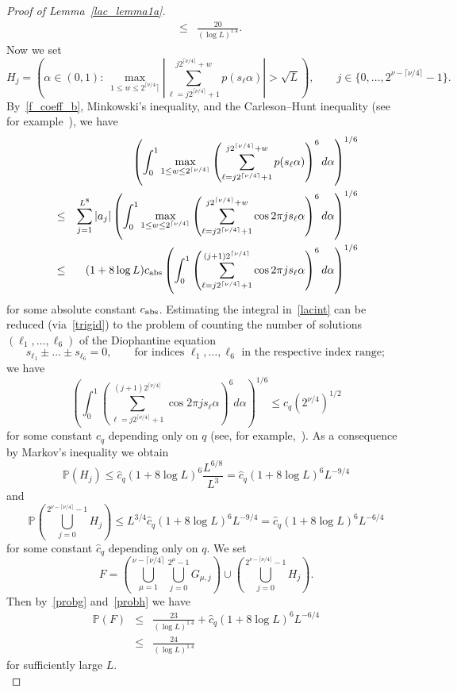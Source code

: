 \documentclass[12pt]{amsart}
\newcommand {\p} {\mathbb{P}}
\begin{document}
\begin{proof}[Proof of Lemma~\ref{lac_lemma1a}]
\begin{eqnarray}
& \leq & \frac{20}{(\log L)^{1.4}}. \label{probg}
\end{eqnarray}
Now we set
$$
H_{j} = \left( \alpha \in (0,1):~\max_{1 \leq w \leq 2^{\lceil \nu/4} \rceil} \left| \sum_{\ell=j 2^{\lceil \nu/4 \rceil} + 1}^{j 2^{\lceil \nu/4 \rceil} + w} p(s_\ell \alpha) \right| >  \sqrt{L} \right), \qquad j \in \{0, \dots, 2^{\nu - \lceil \nu/4 \rceil} -1 \}.
$$
By~\eqref{f_coeff_b}, Minkowski's inequality, and the Carleson--Hunt inequality (see for example~\cite{arias}), we have
\begin{eqnarray}
& & \left( \int_0^1 \max_{1 \leq w \leq 2^{\lceil \nu/4 \rceil}} \left( \sum_{\ell=j 2^{\lceil \nu/4 \rceil} + 1}^{j 2^{\lceil \nu/4 \rceil}+w} p(s_\ell \alpha) \right)^6 d\alpha \right)^{1/6} \nonumber\\
& \leq & \sum_{j=1}^{L^8} |a_j| \left( \int_0^1 \max_{1 \leq w \leq 2^{\lceil \nu/4 \rceil}} \left( \sum_{\ell=j 2^{\lceil \nu/4 \rceil} + 1}^{j 2^{\lceil \nu/4 \rceil}+w} \cos 2 \pi j s_\ell \alpha \right)^6 d\alpha \right)^{1/6} \nonumber\\
& \leq & (1 + 8 \log L) c_{\textup{abs}} \left( \int_0^1  \left( \sum_{\ell=j 2^{\lceil \nu/4 \rceil} + 1}^{(j+1) 2^{\lceil \nu/4 \rceil}} \cos 2 \pi j s_\ell \alpha \right)^6 d\alpha \right)^{1/6} \label{lacint}
\end{eqnarray}
for some absolute constant $c_{\textup{abs}}$. Estimating the integral in~\eqref{lacint} can be reduced (via~\eqref{trigid}) to the problem of counting the number of solutions $(\ell_1, \dots, \ell_6)$ of the Diophantine equation
$$
s_{\ell_1} \pm \dots \pm s_{\ell_6} = 0, \qquad \textrm{for indices $\ell_1, \dots, \ell_6$ in the respective index range};
$$
we have
$$
\left( \int_0^1  \left( \sum_{\ell=j 2^{\lceil \nu/4 \rceil} + 1}^{(j+1) 2^{\lceil \nu/4 \rceil}} \cos 2 \pi j s_\ell \alpha \right)^6 d\alpha \right)^{1/6} \leq c_q \left( 2^{\nu/4} \right)^{1/2}
$$
for some constant $c_q$ depending only on $q$ (see, for example,~\cite{erdgal}). As a consequence by Markov's inequality we obtain 
$$
\p (H_j) \leq \hat{c}_q (1 + 8 \log L)^6 \frac{L^{6/8}}{L^3} = \hat{c}_q (1 + 8 \log L)^6 L^{-9/4}
$$
and
\begin{equation} \label{probh}
\p \left( \bigcup_{j=0}^{2^{\nu - \lceil \nu/4 \rceil} -1} H_j \right) \leq L^{3/4} \hat{c}_q (1 + 8 \log L)^6 L^{-9/4} = \hat{c}_q (1 + 8 \log L)^6 L^{-6/4}
\end{equation}
for some constant $\hat{c}_q$ depending only on $q$. We set
$$
F = \left( \bigcup_{\mu=1}^{\nu-\lceil\nu/4\rceil} \bigcup_{j=0}^{2^{\mu}-1} G_{\mu,j} \right) \cup \left( \bigcup_{j=0}^{2^{\nu - \lceil\nu/4\rceil} -1} H_j \right).
$$
Then by~\eqref{probg} and~\eqref{probh} we have
\begin{eqnarray} 
\p \left( F \right) & \leq & \frac{23}{(\log L)^{1.4}} + \hat{c}_q (1 + 8 \log L)^6 L^{-6/4} \\
& \leq &  \frac{24}{(\log L)^{1.4}} \label{Fprob}
\end{eqnarray}
for sufficiently large $L$.\\


\end{proof}
\end{document}

